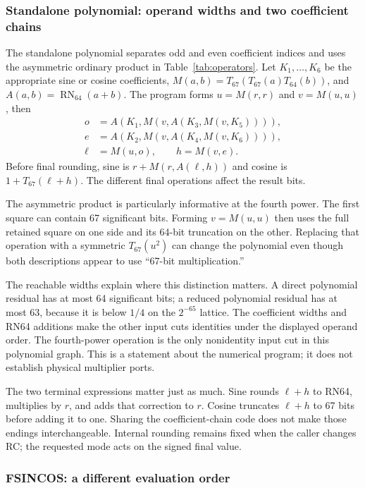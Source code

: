 \documentclass[11pt]{article}
\newcommand{\N}[1]{\operatorname{RN}_{#1}}
\begin{document}
\subsubsection{Standalone polynomial: operand widths and two coefficient chains}
\label{sec:standalone}

The standalone polynomial separates odd and even coefficient indices and
uses the asymmetric ordinary product in Table~\ref{tab:operators}.
Let $K_1,\ldots,K_6$ be the appropriate sine or cosine coefficients,
$M(a,b)=T_{67}(T_{67}(a)T_{64}(b))$, and $A(a,b)=\N{64}(a+b)$.
The program forms $u=M(r,r)$ and $v=M(u,u)$, then
\begin{align}
 o&=A(K_1,M(v,A(K_3,M(v,K_5)))),\\
 e&=A(K_2,M(v,A(K_4,M(v,K_6)))),\\
 \ell&=M(u,o),\qquad h=M(v,e).
\end{align}
Before final rounding, sine is $r+M(r,A(\ell,h))$ and cosine is
$1+T_{67}(\ell+h)$. The different final operations affect the result bits.

The asymmetric product is particularly informative at the fourth power.
The first square can contain 67 significant bits. Forming $v=M(u,u)$ then
uses the full retained square on one side and its 64-bit truncation on the
other. Replacing that operation with a symmetric $T_{67}(u^2)$ can change
the polynomial even though both descriptions appear to use ``67-bit
multiplication.''

The reachable widths explain where this distinction matters. A direct
polynomial residual has at most 64 significant bits; a reduced polynomial
residual has at most 63, because it is below $1/4$ on the $2^{-65}$ lattice.
The coefficient widths and RN64 additions make the other input cuts
identities under the displayed operand order. The fourth-power operation is
the only nonidentity input cut in this polynomial graph. This is a statement
about the numerical program; it does not establish physical multiplier ports.

The two terminal expressions matter just as much. Sine rounds $\ell+h$ to
RN64, multiplies by $r$, and adds that correction to $r$. Cosine truncates
$\ell+h$ to 67 bits before adding it to one. Sharing the coefficient-chain
code does not make those endings interchangeable. Internal rounding remains
fixed when the caller changes RC; the requested mode acts on the signed final
value.

\subsubsection{FSINCOS: a different evaluation order}
\label{sec:paired}
\end{document}
